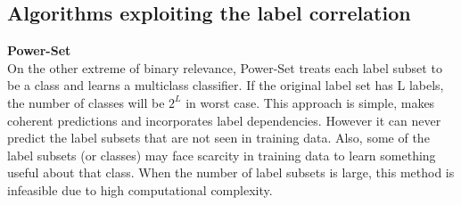 \subsection{Algorithms exploiting the label correlation}
\textbf{Power-Set}\\
On the other extreme of binary relevance, Power-Set treats each label subset to be a class and learns a multiclass classifier. If the original label set has L labels, the number of classes will be $2^L$ in worst case. 
This approach is simple, makes coherent predictions and incorporates label dependencies. However it can never predict the label subsets that are not seen in training data. Also, some of the label subsets (or classes) may face scarcity in training data to learn something useful about that class. When the number of label subsets is large, this method is infeasible due to high computational complexity. 

